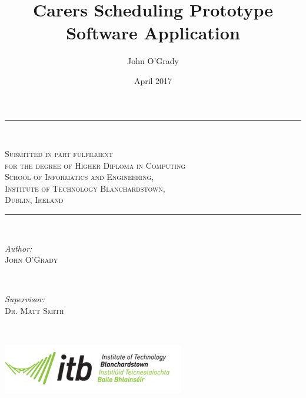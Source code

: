 \documentclass[a4paper]{article}
\begin{document}
\begin{titlepage}

\newcommand{\HRule}{\rule{\linewidth}{0.5mm}}

\title {Carers Scheduling Prototype Software Application}

\author{John O'Grady}
\date{April 2017}

\maketitle
\HRule \\[0.4cm]
\thispagestyle{empty}

\begin{center}
\textsc{\large Submitted in part fulfilment
 \\for the degree of
Higher Diploma in Computing
\\School of Informatics and Engineering,
\\Institute of Technology Blanchardstown,
\\Dublin, Ireland
} 
\end{center}

\HRule \\[2cm]


\begin{minipage}{0.4\textwidth}
\begin{flushleft} \large
\emph{Author:}\\
 \textsc{John O'Grady} 
\end{flushleft}
\end{minipage}
~
\begin{minipage}{0.4\textwidth}
\begin{flushright} \large
\emph{Supervisor:} \\
\textsc{Dr. Matt Smith} 
\end{flushright}
\end{minipage}\\[2cm]

\begin{center}
\includegraphics{itb_logo.jpg}
\end{center}

\end{titlepage}
\end{document}
